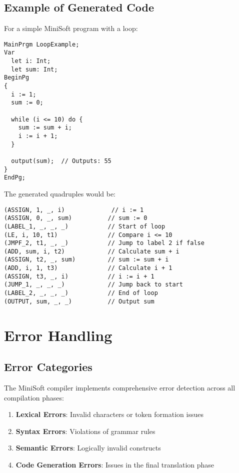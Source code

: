 \documentclass[12pt,a4paper]{article}
\begin{document}
\subsection{Example of Generated Code}
For a simple MiniSoft program with a loop:

\begin{lstlisting}[caption={Sample MiniSoft Program}]
MainPrgm LoopExample;
Var
  let i: Int;
  let sum: Int;
BeginPg
{
  i := 1;
  sum := 0;
  
  while (i <= 10) do {
    sum := sum + i;
    i := i + 1;
  }
  
  output(sum);  // Outputs: 55
}
EndPg;
\end{lstlisting}

The generated quadruples would be:

\begin{lstlisting}[caption={Generated Quadruples}]
(ASSIGN, 1, _, i)             // i := 1
(ASSIGN, 0, _, sum)          // sum := 0
(LABEL_1, _, _, _)           // Start of loop
(LE, i, 10, t1)              // Compare i <= 10
(JMPF_2, t1, _, _)           // Jump to label 2 if false
(ADD, sum, i, t2)            // Calculate sum + i
(ASSIGN, t2, _, sum)         // sum := sum + i
(ADD, i, 1, t3)              // Calculate i + 1
(ASSIGN, t3, _, i)           // i := i + 1
(JUMP_1, _, _, _)            // Jump back to start
(LABEL_2, _, _, _)           // End of loop
(OUTPUT, sum, _, _)          // Output sum
\end{lstlisting}

\section{Error Handling}
\subsection{Error Categories}
The MiniSoft compiler implements comprehensive error detection across all compilation phases:

\begin{enumerate}
	\item \textbf{Lexical Errors}: Invalid characters or token formation issues
	\item \textbf{Syntax Errors}: Violations of grammar rules
	\item \textbf{Semantic Errors}: Logically invalid constructs
	\item \textbf{Code Generation Errors}: Issues in the final translation phase
\end{enumerate}
\end{document}
